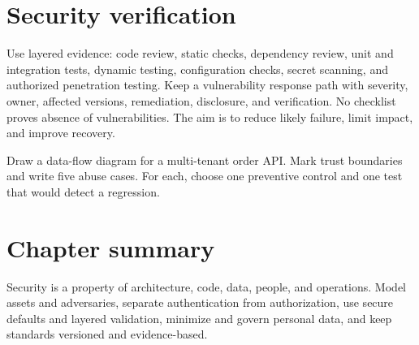 \section{Security verification}
Use layered evidence: code review, static checks, dependency review, unit and
integration tests, dynamic testing, configuration checks, secret scanning, and
authorized penetration testing. Keep a vulnerability response path with
severity, owner, affected versions, remediation, disclosure, and verification.
No checklist proves absence of vulnerabilities. The aim is to reduce likely
failure, limit impact, and improve recovery.

\begin{exercise}
Draw a data-flow diagram for a multi-tenant order API. Mark trust boundaries and
write five abuse cases. For each, choose one preventive control and one test that
would detect a regression.
\end{exercise}

\section{Chapter summary}
Security is a property of architecture, code, data, people, and operations.
Model assets and adversaries, separate authentication from authorization, use
secure defaults and layered validation, minimize and govern personal data, and
keep standards versioned and evidence-based.
